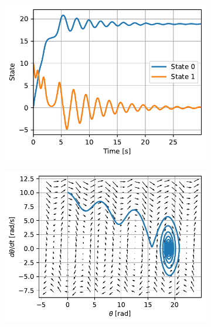\documentclass{cmc}
\begin{document}
\begin{figure}[H]
  \centering
  \begin{subfigure}[b]{0.49\textwidth}
    { \centering
      \includegraphics[width=\textwidth]{figures/Multiple_loops_case_state_(x0=[0dot1,_10dot0])}
      \label{fig:pendulum-high-vel-state}
    }
    \caption{}
  \end{subfigure}
  \begin{subfigure}[b]{0.49\textwidth}
    { \centering
      \includegraphics[width=\textwidth]{figures/Multiple_loops_case_phase_(x0=[0dot1,_10dot0])}
      \label{fig:pendulum-high-vel-phase}
    }
    \caption{}
  \end{subfigure}
  \caption{}
  \label{fig:pendulum-high-vel}
\end{figure}
\end{document}
